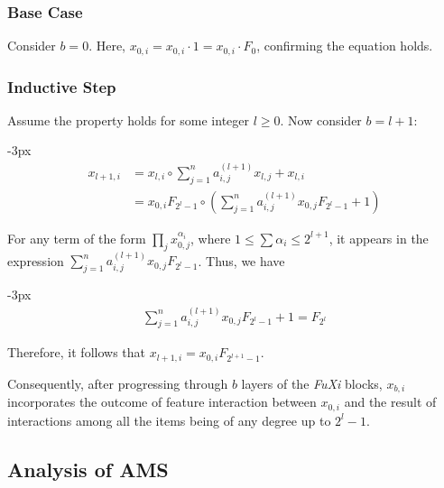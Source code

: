 \subsubsection{Base Case} Consider $b = 0$. Here, $x_{0,i} = x_{0,i} \cdot 1 = x_{0,i} \cdot F_0$, confirming the equation holds.
\subsubsection{Inductive Step} Assume the property holds for some integer $l \geq 0$. Now consider $b = l + 1$:
\begin{shrinkeq}{-3px}
\begin{align}
  x_{l+1, i} &= x_{l, i} \circ \sum_{j = 1}^n a_{i, j}^{(l+1)} x_{l, j} + x_{l, i} \\
  &= x_{0, i}F_{2^{l}-1} \circ \left (\sum_{j=1}^na_{i, j}^{(l+1)} x_{0, j} F_{2^{l}-1} + 1\right)
\end{align}
\end{shrinkeq}
For any term of the form $\prod_j x_{0,j}^{\alpha_i}$, where $1 \leq \sum \alpha_i \leq 2^{l+1}$, it appears in the expression $\sum_{j=1}^n a_{i,j}^{(l+1)} x_{0,j} F_{2^l-1}$. Thus, we have
\begin{shrinkeq}{-3px}
    \begin{align}
      \sum_{j=1}^n a_{i,j}^{(l+1)} x_{0,j} F_{2^l-1} + 1 = F_{2^l} 
    \end{align}
\end{shrinkeq}
Therefore, it follows that $x_{l+1,i} = x_{0,i} F_{2^{l+1} - 1}$.

Consequently, after progressing through $b$ layers of the \textit{FuXi} blocks, $x_{b, i}$ incorporates the outcome of feature interaction between $x_{0, i}$ and the result of interactions among all the items being of any degree up to $2^l - 1$.

\subsection{Analysis of AMS}

